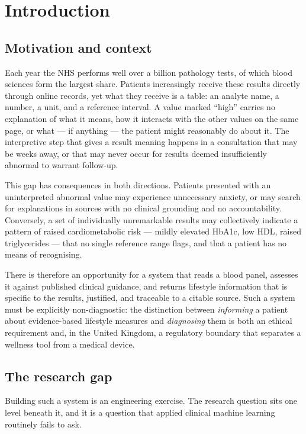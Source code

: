 \documentclass[11pt,a4paper]{article}
\begin{document}
\section{Introduction}

\subsection{Motivation and context}

Each year the NHS performs well over a billion pathology tests, of which blood
sciences form the largest share. Patients increasingly receive these results
directly through online records, yet what they receive is a table: an analyte
name, a number, a unit, and a reference interval. A value marked ``high'' carries
no explanation of what it means, how it interacts with the other values on the
same page, or what --- if anything --- the patient might reasonably do about it.
The interpretive step that gives a result meaning happens in a consultation that
may be weeks away, or that may never occur for results deemed insufficiently
abnormal to warrant follow-up.

This gap has consequences in both directions. Patients presented with an
uninterpreted abnormal value may experience unnecessary anxiety, or may search for
explanations in sources with no clinical grounding and no accountability.
Conversely, a set of individually unremarkable results may collectively indicate a
pattern of raised cardiometabolic risk --- mildly elevated HbA1c, low HDL,
raised triglycerides --- that no single reference range flags, and that a patient
has no means of recognising.

There is therefore an opportunity for a system that reads a blood panel, assesses
it against published clinical guidance, and returns lifestyle information that is
specific to the results, justified, and traceable to a citable source. Such a
system must be explicitly non-diagnostic: the distinction between \emph{informing}
a patient about evidence-based lifestyle measures and \emph{diagnosing} them is
both an ethical requirement and, in the United Kingdom, a regulatory boundary that
separates a wellness tool from a medical device.

\subsection{The research gap}

Building such a system is an engineering exercise. The research question sits one
level beneath it, and it is a question that applied clinical machine learning
routinely fails to ask.
\end{document}
